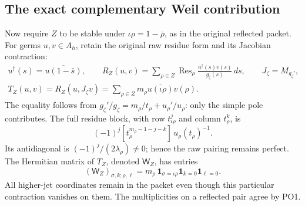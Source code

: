 \documentclass[11pt,a4paper]{article}
\theoremstyle{definition}\newtheorem{definition}[theorem]{Definition}
\providecommand{\Res}{\operatorname{Res}}
\begin{document}
\subsection{The exact complementary Weil contribution}

Now require \(Z\) to be stable under
\(\iota\rho=1-\bar\rho\), as in the original reflected packet.
For germs \(u,v\in A_h\), retain the original raw residue form
and its Jacobian contraction:
\[
 \begin{gathered}
 u^\dagger(s)=\overline{u(1-\bar s)},\qquad
 R_Z(u,v)=\sum_{\rho\in Z}
       \Res_\rho\frac{u^\dagger(s)v(s)}{g_\zeta(s)}\,ds,\qquad
 J_\zeta=M_{g_\zeta'},\\
 T_Z(u,v)=R_Z(u,J_\zeta v)
       =\sum_{\rho\in Z}m_\rho
                  \overline{u(\iota\rho)}v(\rho).
 \end{gathered}
 \tag{PO40}\label{PO:po:trace}
\]
The equality follows from
\(g_\zeta'/g_\zeta=m_\rho/t_\rho+u_\rho'/u_\rho\):
only the simple pole contributes.
The full residue block, with row \(t_{\iota\rho}^j\) and
column \(t_\rho^k\), is
\[
 (-1)^j[t_\rho^{m_\rho-1-j-k}]\,u_\rho(t_\rho)^{-1}.
 \tag{PO41}\label{PO:po:raw-matrix}
\]
Its antidiagonal is \((-1)^j/(2\lambda_\rho)\ne0\);
hence the raw pairing remains perfect. The Hermitian matrix
of \(T_Z\), denoted \(\mathsf W_Z\), has entries
\[
 (\mathsf W_Z)_{\sigma,k;\rho,\ell}
     =m_\rho\,\mathbf1_{\sigma=\iota\rho}
                \mathbf1_{k=0}\mathbf1_{\ell=0}.
 \tag{PO42}\label{PO:po:WZ}
\]
All higher-jet coordinates remain in the packet even though
this particular contraction vanishes on them. The multiplicities
on a reflected pair agree by PO1.
\end{document}
